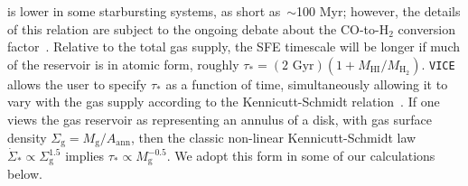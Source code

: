 is lower in some starbursting systems, as short as~$\sim$100 Myr; however, the 
details of this relation are subject to the ongoing debate about the 
CO-to-H$_2$ conversion 
factor~\citep[for details, see the review in][]{Kennicutt2012}. 
Relative to the total gas supply, the SFE timescale will be longer if much of 
the reservoir is in atomic form, roughly 
$\tau_* = (\text{2 Gyr})(1 + M_\text{HI}/M_{\text{H}_2})$. 
\texttt{VICE} allows the 
user to specify $\tau_*$ as a function of time, simultaneously allowing it to 
vary with the gas supply according to the Kennicutt-Schmidt 
relation~\citep{Schmidt1959, Schmidt1963, Kennicutt1998}. If one views the 
gas reservoir as representing an annulus of a disk, with gas surface density 
$\Sigma_\text{g} = M_\text{g}/A_\text{ann}$, then the classic non-linear 
Kennicutt-Schmidt law $\dot{\Sigma}_* \propto \Sigma_\text{g}^{1.5}$ implies 
$\tau_* \propto M_\text{g}^{-0.5}$. We adopt this form in some of our 
calculations below. 

